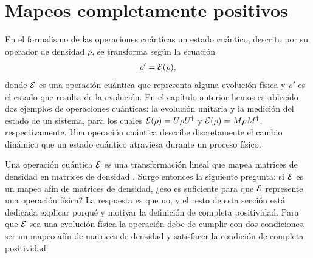 \section{Mapeos completamente positivos} %
En el formalismo de las operaciones cuánticas un estado cuántico,
descrito por su operador de densidad $\rho$,
se transforma según la ecuación \cite{nielsen_chuang_2011}
\begin{align}
\rho' = \mathcal{E} (\rho)
\label{eq:E(rho)},
\end{align} 
donde $\mathcal{E}$ es una operación cuántica que representa alguna evolución 
física y $\rho'$ es el estado que resulta de la evolución.
En el capítulo anterior hemos 
establecido dos ejemplos de operaciones cuánticas: la evolución unitaria 
y la medición del estado de un sistema, 
para los cuales $\mathcal{E} \qty(\rho)=U\rho U^{\dagger}$ y 
$\mathcal{E}(\rho)=M\rho M^{\dagger}$, respectivamente. 
Una operación cuántica describe discretamente 
el cambio dinámico que un estado cuántico 
atraviesa durante un proceso físico. 

Una operación cuántica $\mathcal{E}$ es
una transformación lineal que mapea matrices de densidad en matrices 
de densidad \cite{bengtsson_zyczkowski_2017}. Surge entonces la siguiente
pregunta: si $\mathcal{E}$ es un mapeo afín de matrices de densidad, ¿eso es
suficiente para que $\mathcal{E}$ represente una operación física? 
La respuesta es que no, y el resto de esta sección está dedicada
explicar porqué y motivar la definición de completa positividad.  
Para que $\mathcal{E}$ sea una evolución física la operación debe de cumplir con dos
condiciones, ser un mapeo afín de matrices de densidad 
y satisfacer la condición de completa positividad. 

